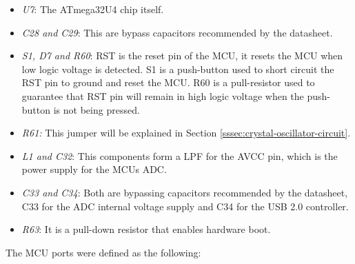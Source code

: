 			\begin{itemize}
				\item\textit{U7}: The ATmega32U4 chip itself.
				\item\textit{C28 and C29}: This are bypass capacitors recommended by the datasheet.
				\item\textit{S1, D7 and R60}: RST is the reset pin of the MCU, it resets the MCU when low logic voltage is detected. S1 is a push-button used to short circuit the RST pin to ground and reset the MCU. R60 is a pull-resistor used to guarantee that RST pin will remain in high logic voltage when the push-button is not being pressed. 
				\item\textit{R61:} This jumper will be explained in Section \ref{sssec:crystal-oscillator-circuit}.\label{itm:crystal-oscillator-jumper}
				\item\textit{L1 and C32}: This components form a LPF for the AVCC pin, which is the power supply for the MCUs ADC.
				\item\textit{C33 and C34}: Both are bypassing capacitors recommended by the datasheet, C33 for the ADC internal voltage supply and C34 for the USB 2.0 controller.
				\item\textit{R63}: It is a pull-down resistor that enables hardware boot.
			\end{itemize}

			The MCU ports were defined as the following:

